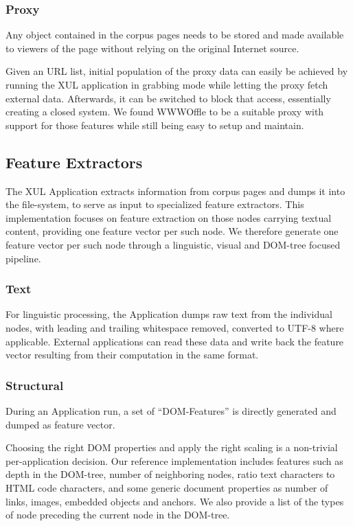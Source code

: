 \subsubsection{Proxy}

Any object contained in the corpus pages needs to be stored and made available to viewers of the page without relying on the original Internet source.

Given an URL list, initial population of the proxy data can easily be achieved by running the XUL application in grabbing mode while letting the proxy fetch external data.
Afterwards, it can be switched to block that access, essentially creating a closed system.
We found WWWOffle to be a suitable proxy with support for those features while still being easy to setup and maintain.

\subsection{Feature Extractors\label{extract}}

The XUL Application extracts information from corpus pages and dumps it into the file-system, to serve as input to specialized feature extractors.
This implementation focuses on feature extraction on those nodes carrying textual content, providing one feature vector per such node.
We therefore generate one feature vector per such node through a linguistic, visual and DOM-tree focused pipeline.

\subsubsection{Text}

For linguistic processing, the Application dumps raw text from the individual nodes, with leading and trailing whitespace removed, converted to UTF-8 where applicable.
External applications can read these data and write back the feature vector resulting from their computation in the same format.

\subsubsection{Structural}

During an Application run, a set of ``DOM-Features'' is directly generated and dumped as feature vector.

Choosing the right DOM properties and apply the right scaling is a non-trivial per-application decision.
Our reference implementation includes features such as depth in the DOM-tree, number of neighboring nodes, ratio text characters to HTML code characters,
  and some generic document properties as number of links, images, embedded objects and anchors.
We also provide a list of the types of node preceding the current node in the DOM-tree.


